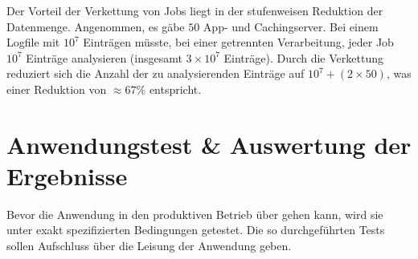 Der Vorteil der Verkettung von Jobs liegt in der stufenweisen Reduktion der Datenmenge. Angenommen, es gäbe $50$ App- und Cachingserver. Bei einem Logfile mit $10^7$ Einträgen müsste, bei einer getrennten Verarbeitung, jeder Job $10^7$ Einträge analysieren (insgesamt $3 \times 10^7$ Einträge). Durch die Verkettung reduziert sich die Anzahl der zu analysierenden Einträge auf $10^7+ (2 \times 50)$, was einer Reduktion von $\approx 67\%$ entspricht.





\section{Anwendungstest \& Auswertung der Ergebnisse}
Bevor die Anwendung in den produktiven Betrieb über gehen kann, wird sie unter exakt spezifizierten Bedingungen getestet. Die so durchgeführten Tests sollen Aufschluss über die Leisung der Anwendung geben.

